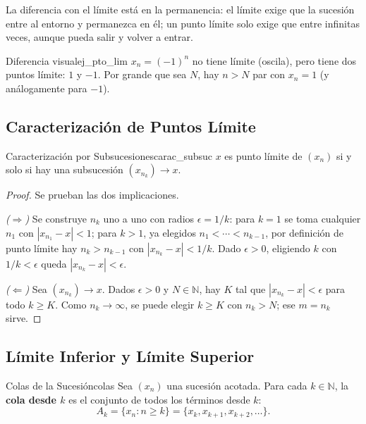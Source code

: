 \documentclass[11pt, a4paper]{article}
\begin{document}
La diferencia con el límite está en la permanencia: el límite exige que la sucesión entre al
entorno y permanezca en él; un punto límite solo exige que entre infinitas veces, aunque pueda
salir y volver a entrar.

\begin{ejemplo}{Diferencia visual}{ej_pto_lim}
$x_n = (-1)^n$ no tiene límite (oscila), pero tiene dos puntos límite: $1$ y $-1$. Por grande
que sea $N$, hay $n > N$ par con $x_n = 1$ (y análogamente para $-1$).
\end{ejemplo}

\subsection{Caracterización de Puntos Límite}

\begin{teorema}{Caracterización por Subsucesiones}{carac_subsuc}
$x$ es punto límite de $(x_n)$ si y solo si hay una subsucesión $(x_{n_k}) \to x$.
\end{teorema}

\begin{proof}
Se prueban las dos implicaciones.

\textit{($\Rightarrow$)} Se construye $n_k$ uno a uno con radios $\epsilon = 1/k$: para $k=1$ se toma
cualquier $n_1$ con $|x_{n_1} - x| < 1$; para $k > 1$, ya elegidos $n_1 < \cdots < n_{k-1}$, por
definición de punto límite hay $n_k > n_{k-1}$ con $|x_{n_k} - x| < 1/k$. Dado $\epsilon > 0$,
eligiendo $k$ con $1/k < \epsilon$ queda $|x_{n_k} - x| < \epsilon$.

\textit{($\Leftarrow$)} Sea $(x_{n_k}) \to x$. Dados $\epsilon > 0$ y $N \in \mathbb{N}$, hay $K$ tal que
$|x_{n_k} - x| < \epsilon$ para todo $k \ge K$. Como $n_k \to \infty$, se puede elegir $k \ge K$ con
$n_k > N$; ese $m = n_k$ sirve.
\end{proof}

\subsection{Límite Inferior y Límite Superior}

\begin{definicion}{Colas de la Sucesión}{colas}
Sea $(x_n)$ una sucesión acotada. Para cada $k \in \mathbb{N}$, la \textbf{cola desde $k$} es el
conjunto de todos los términos desde $k$:
$$ A_k = \{ x_n : n \ge k \} = \{ x_k, x_{k+1}, x_{k+2}, \dots \}. $$
\end{definicion}
\end{document}
